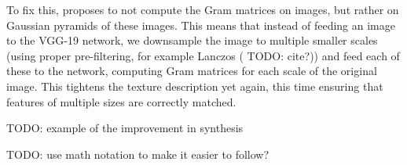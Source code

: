 To fix this, \citet{Snelgrove2017} proposes to not compute the Gram matrices on images, but rather on Gaussian pyramids of these images. This means that instead of feeding an image to the VGG-19 network, we downsample the image to multiple smaller scales (using proper pre-filtering, for example Lanczos ({\color{red} TODO: cite?})) and feed each of these to the network, computing Gram matrices for each scale of the original image. This tightens the texture description yet again, this time ensuring that features of multiple sizes are correctly matched.

{\color{red} TODO: example of the improvement in synthesis}

{\color{red} TODO: use math notation to make it easier to follow?}